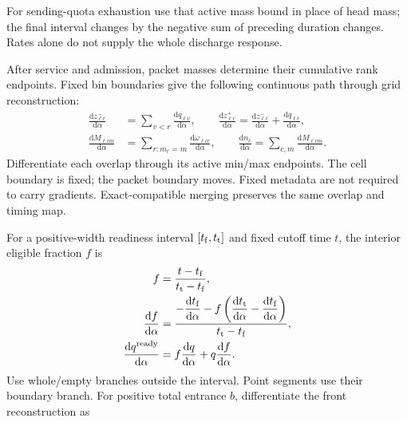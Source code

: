 \documentclass[10pt,a4paper]{article}
\newenvironment{revision}{\begingroup\color{revisionred}}{\par\endgroup}
\begin{document}
\begin{revision}
For sending-quota exhaustion use that active mass bound in place of
head mass; the final interval changes by the negative sum of preceding
duration changes. Rates alone do not supply the whole discharge response.

After service and admission, packet masses determine their cumulative
rank endpoints. Fixed bin boundaries give the following continuous path
through grid reconstruction:
\begin{equation}
 \begin{aligned}
 \frac{\mathrm dz^-_{\ell r}}{\mathrm d\alpha}
 &=\sum_{v<r}\frac{\mathrm dq_{\ell v}}{\mathrm d\alpha},\qquad
 \frac{\mathrm dz^+_{\ell r}}{\mathrm d\alpha}
 =\frac{\mathrm dz^-_{\ell r}}{\mathrm d\alpha}
                  +\frac{\mathrm dq_{\ell r}}{\mathrm d\alpha},\\
 \frac{\mathrm dM_{\ell cm}}{\mathrm d\alpha}
 &=\sum_{r:m_r=m}\frac{\mathrm d\omega_{\ell cr}}{\mathrm d\alpha},
 \qquad
 \frac{\mathrm dn_\ell}{\mathrm d\alpha}
 =\sum_{c,m}\frac{\mathrm dM_{\ell cm}}{\mathrm d\alpha}.
 \end{aligned}
 \label{eq:grid-derivative}
\end{equation}
Differentiate each overlap through its active min/max endpoints. The
cell boundary is fixed; the packet boundary moves. Fixed metadata are
not required to carry gradients. Exact-compatible merging preserves the
same overlap and timing map.

For a positive-width readiness interval $[t_{\rm f},t_{\rm t}]$ and
fixed cutoff time $t$, the interior eligible fraction $f$ is
\begin{equation}
 \begin{aligned}
 f&=\frac{t-t_{\rm f}}{t_{\rm t}-t_{\rm f}},\\
 \frac{\mathrm df}{\mathrm d\alpha}
 &=\frac{\displaystyle
 -\frac{\mathrm dt_{\rm f}}{\mathrm d\alpha}
 -f\left(\frac{\mathrm dt_{\rm t}}{\mathrm d\alpha}
                 -\frac{\mathrm dt_{\rm f}}{\mathrm d\alpha}\right)}
 {t_{\rm t}-t_{\rm f}},\\
 \frac{\mathrm dq^{\rm ready}}{\mathrm d\alpha}
 &=f\frac{\mathrm dq}{\mathrm d\alpha}
                       +q\frac{\mathrm df}{\mathrm d\alpha}.
 \end{aligned}
 \label{eq:eligibility-derivative}
\end{equation}
Use whole/empty branches outside the interval. Point segments use their
boundary branch. For positive total entrance $b$, differentiate the
front reconstruction as


\end{revision}
\end{document}
